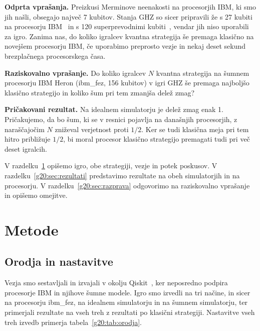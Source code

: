 \textbf{Odprta vprašanja.} Preizkusi Merminove neenakosti na procesorjih IBM, ki smo jih našli, obsegajo največ 7 kubitov. Stanja GHZ so sicer pripravili že s 27 kubiti na procesorju IBM~\cite{g20:mooney2021} in s 120 superprevodnimi kubiti~\cite{g20:ibm2025bigcats}, vendar jih niso uporabili za igro. Zanima nas, do koliko igralcev kvantna strategija še premaga klasično na novejšem procesorju IBM, če uporabimo preprosto vezje in nekaj deset sekund brezplačnega procesorskega časa.

\begin{svgraybox}
\textbf{Raziskovalno vprašanje.} Do koliko igralcev $N$ kvantna strategija na šumnem procesorju IBM Heron (ibm\_fez, 156 kubitov) v igri GHZ še premaga najboljšo klasično strategijo in koliko šum pri tem zmanjša delež zmag?

\textbf{Pričakovani rezultat.} Na idealnem simulatorju je delež zmag enak 1. Pričakujemo, da bo šum, ki se v resnici pojavlja na današnjih procesorjih, z naraščajočim $N$ zniževal verjetnost proti $1/2$. Ker se tudi klasična meja pri tem hitro približuje $1/2$, bi moral procesor klasično strategijo premagati tudi pri več deset igralcih.
\end{svgraybox}

V razdelku~\ref{g20:sec:metode} opišemo igro, obe strategiji, vezje in potek poskusov. V razdelku~\ref{g20:sec:rezultati} predstavimo rezultate na obeh simulatorjih in na procesorju. V razdelku~\ref{g20:sec:razprava} odgovorimo na raziskovalno vprašanje in opišemo omejitve.


\section{Metode}
\label{g20:sec:metode}

\subsection{Orodja in nastavitve}
\label{g20:sec:orodja}

Vezja smo sestavljali in izvajali v okolju Qiskit~\cite{qiskit2024}, ker neposredno podpira procesorje IBM in njihove šumne modele. Igro smo izvedli na tri načine, in sicer na procesorju ibm\_fez, na idealnem simulatorju in na šumnem simulatorju, ter primerjali rezultate na vseh treh z rezultati po klasični strategiji. Nastavitve vseh treh izvedb primerja tabela~\ref{g20:tab:orodja}.

